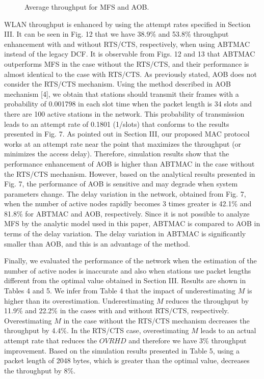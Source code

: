 \documentclass[10pt,twocolumn,oneside,submit]{JCNtran}
\begin{document}
\begin{figure}[!t]
\begin{center}
\epsfxsize=8cm \leavevmode{} \caption{Average throughput for MFS and AOB.} \label{fig:13}
\end{center}
\end{figure}
\par WLAN throughput is enhanced by using the attempt rates specified in Section III. It can be seen in Fig. 12 that we have 38.9\% and 53.8\% throughput enhancement with and without RTS/CTS, respectively, when using ABTMAC instead of the legacy DCF. It is observable from Figs. 12 and 13 that ABTMAC outperforms MFS in the case without the RTS/CTS, and their performance is almost identical to the case with RTS/CTS. As previously stated, AOB does not consider the RTS/CTS mechanism. Using the method described in AOB mechanism [4], we obtain that stations should transmit their frames with a probability of 0.001798 in each slot time when the packet length is 34 slots and there are 100 active stations in the network. This probability of transmission leads to an attempt rate of 0.1801 (1/slots) that conforms to the results presented in Fig. 7. As pointed out in Section III, our proposed MAC protocol works at an attempt rate near the point that maximizes the throughput (or minimizes the access delay). Therefore, simulation results show that the performance enhancement of AOB is higher than ABTMAC in the case without the RTS/CTS mechanism. However, based on the analytical results presented in Fig. 7, the performance of AOB is sensitive and may degrade when system parameters change. The delay variation in the network, obtained from Fig. 7, when the number of active nodes rapidly becomes 3 times greater is 42.1\% and 81.8\% for ABTMAC and AOB, respectively. Since it is not possible to analyze MFS by the analytic model used in this paper, ABTMAC is compared to AOB in terms of the delay variation. The delay variation in ABTMAC is significantly smaller than AOB, and this is an advantage of the method.
\par Finally, we evaluated the performance of the network when the estimation of the number of active nodes is inaccurate and also when stations use packet lengths different from the optimal value obtained in Section III. Results are shown in Tables 4 and 5. We infer from Table 4 that the impact of underestimating $M$ is higher than its overestimation. Underestimating $M$ reduces the throughput by 11.9\% and 22.2\% in the cases with and without RTS/CTS, respectively. Overestimating $M$ in the case without the RTS/CTS mechanism decreases the throughput by 4.4\%. In the RTS/CTS case, overestimating $M$ leads to an actual attempt rate that reduces the $OVRHD$ and therefore we have 3\% throughput improvement. Based on the simulation results presented in Table 5, using a packet length of 2048 bytes, which is greater than the optimal value, decreases the throughput by 8\%.
\end{document}
